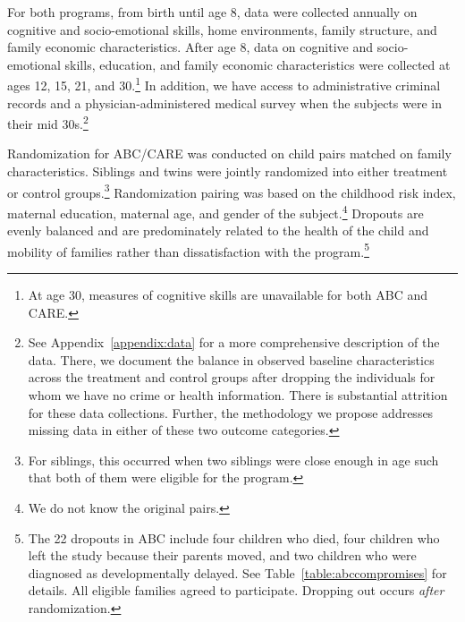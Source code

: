 For both programs, from birth until age 8, data were collected annually on cognitive and socio-emotional skills, home environments, family structure, and family economic characteristics. After age 8, data on cognitive and socio-emotional skills, education, and family economic characteristics were collected at ages 12, 15, 21, and 30.\footnote{At age 30, measures of cognitive skills are unavailable for both ABC and CARE.} In addition, we have access to administrative criminal records and a physician-administered medical survey when the subjects were in their mid 30s.\footnote{See  Appendix~\ref{appendix:data} for a more comprehensive description of the data. There, we document the balance in observed baseline characteristics across the treatment and control groups after dropping the individuals for whom we have no crime or health information. There is substantial attrition for these data collections. Further, the methodology we propose addresses missing data in either of these two outcome categories.}

Randomization for ABC/CARE was conducted on child pairs matched on family characteristics. Siblings and twins were jointly randomized into either treatment or control groups.\footnote{For siblings, this occurred when two siblings were close enough in age such that both of them were eligible for the program.} Randomization pairing was based on the childhood risk index, maternal education, maternal age, and gender of the subject.\footnote{We do not know the original pairs.} Dropouts are evenly balanced and are predominately related to the health of the child and mobility of families rather than dissatisfaction with the program.\footnote{The 22 dropouts in ABC include four children who died, four children who left the study because their parents moved, and two children who were diagnosed as developmentally delayed. See Table~\ref{table:abccompromises} for details. All eligible families agreed to participate. Dropping out occurs \emph{after} randomization.}

